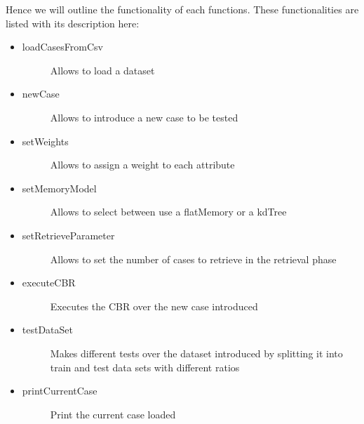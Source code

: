 \documentclass[11pt]{article}
\begin{document}
Hence we will outline the functionality of each functions. These functionalities are listed with its description here:

\begin{itemize}
    \item \begin{description}
            \item[loadCasesFromCsv] Allows to load a dataset
        \end{description}
    \item \begin{description}
        \item[newCase] Allows to introduce a new case to be tested
    \end{description}              
    \item \begin{description}
        \item[setWeights] Allows to assign a weight to each attribute
    \end{description}              
    \item \begin{description}
        \item[setMemoryModel] Allows to select between use a flatMemory or a kdTree
    \end{description}              
    \item \begin{description}
        \item[setRetrieveParameter] Allows to set the number of cases to retrieve in the retrieval phase
    \end{description}              
    \item \begin{description}
        \item[executeCBR] Executes the CBR over the new case introduced    
    \end{description}              
    \item \begin{description}
        \item[testDataSet] Makes different tests over the dataset introduced by splitting it into train and test data sets with different ratios    
    \end{description}              
    \item \begin{description}
        \item[printCurrentCase] Print the current case loaded

\end{description}
\end{itemize}
\end{document}
